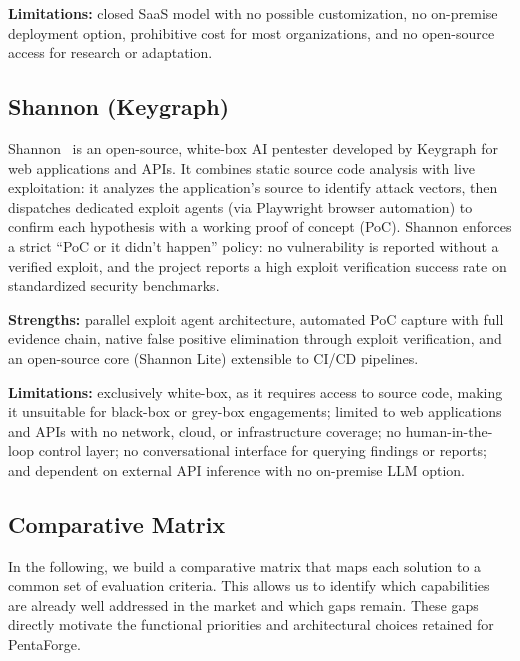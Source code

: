 \documentclass[12pt,a4paper]{report}
\begin{document}
\textbf{Limitations:} closed SaaS model with no possible customization, no
on-premise deployment option, prohibitive cost for most organizations, and no
open-source access for research or adaptation.

\subsection{Shannon (Keygraph)}

Shannon~\cite{shannon} is an open-source, white-box AI pentester developed by
Keygraph for web applications and APIs. It combines static source code analysis with
live exploitation: it analyzes the application's source to identify attack vectors,
then dispatches dedicated exploit agents (via Playwright browser automation) to
confirm each hypothesis with a working proof of concept (PoC). Shannon enforces a
strict ``PoC or it didn't happen'' policy: no vulnerability is reported without a
verified exploit, and the project reports a high exploit verification success rate on
standardized security benchmarks.

\textbf{Strengths:} parallel exploit agent architecture, automated PoC capture with
full evidence chain, native false positive elimination through exploit verification,
and an open-source core (Shannon Lite) extensible to CI/CD pipelines.

\textbf{Limitations:} exclusively white-box, as it requires access to source code,
making it unsuitable for black-box or grey-box engagements; limited to web
applications and APIs with no network, cloud, or infrastructure coverage; no
human-in-the-loop control layer; no conversational interface for querying findings
or reports; and dependent on external API inference with no on-premise LLM option.
\subsection{Comparative Matrix}

In the following, we build a comparative matrix that maps each solution to a common
set of evaluation criteria. This allows us to identify which capabilities are already
well addressed in the market and which gaps remain. These gaps directly motivate the
functional priorities and architectural choices retained for PentaForge.
\end{document}
